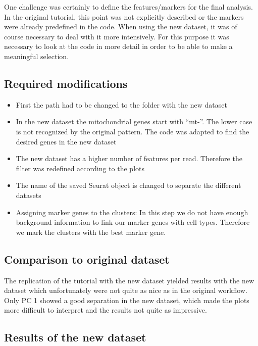 \documentclass[a4paper, 10pt]{scrartcl}
\providecommand{\tightlist}{%
  \setlength{\itemsep}{0pt}\setlength{\parskip}{0pt}}
\begin{document}
One challenge was certainly to define the features/markers for the final
analysis. In the original tutorial, this point was not explicitly
described or the markers were already predefined in the code. When using
the new dataset, it was of course necessary to deal with it more
intensively. For this purpose it was necessary to look at the code in
more detail in order to be able to make a meaningful selection.

\hypertarget{required-modifications}{%
\subsection{Required modifications}\label{required-modifications}}

\begin{itemize}
\tightlist
\item
  First the path had to be changed to the folder with the new dataset
\item
  In the new dataset the mitochondrial genes start with ``mt-''. The
  lower case is not recognized by the original pattern. The code was
  adapted to find the desired genes in the new dataset
\item
  The new dataset has a higher number of features per read. Therefore
  the filter was redefined according to the plots
\item
  The name of the saved Seurat object is changed to separate the
  different datasets
\item
  Assigning marker genes to the clusters: In this step we do not have
  enough background information to link our marker genes with cell
  types. Therefore we mark the clusters with the best marker gene.
\end{itemize}

\hypertarget{comparison-to-original-dataset}{%
\subsection{Comparison to original
dataset}\label{comparison-to-original-dataset}}

The replication of the tutorial with the new dataset yielded results
with the new dataset which unfortunately were not quite as nice as in
the original workflow. Only PC 1 showed a good separation in the new
dataset, which made the plots more difficult to interpret and the
results not quite as impressive.

\hypertarget{results-of-the-new-dataset}{%
\subsection{Results of the new
dataset}\label{results-of-the-new-dataset}}
\end{document}
